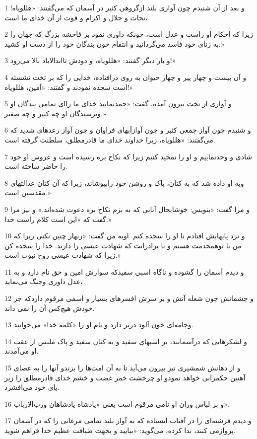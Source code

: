 \par 1 و بعد از آن شنیدم چون آوازی بلند ازگروهی کثیر در آسمان که می‌گفتند: «هللویاه! نجات و جلال و اکرام و قوت از آن خدای ما است،
\par 2 زیرا که احکام او راست و عدل است، چونکه داوری نمود بر فاحشه بزرگ که جهان را به زنای خود فاسد می‌گردانید و انتقام خون بندگان خود را از دست او کشید.»
\par 3 و بار دیگر گفتند: «هللویاه، و دودش تاابدالاباد بالا می‌رود!»
\par 4 و آن بیست و چهار پیر و چهار حیوان به روی درافتاده، خدایی را که بر تخت نشسته است سجده نمودند و گفتند: «آمین، هللویاه!»
\par 5 و آوازی از تخت بیرون آمده، گفت: «حمدنمایید خدای ما را‌ای تمامی بندگان او وترسندگان او چه کبیر و چه صغیر.»
\par 6 و شنیدم چون آواز جمعی کثیر و چون آوازآبهای فراوان و چون آواز رعدهای شدید که می‌گفتند: «هللویاه، زیرا خداوند خدای ما قادرمطلق، سلطنت گرفته است.
\par 7 شادی و وجدنماییم و او را تمجید کنیم زیرا که نکاح بره رسیده است و عروس او خود را حاضر ساخته است.
\par 8 وبه او داده شد که به کتان، پاک و روشن خود رابپوشاند، زیرا که آن کتان عدالتهای مقدسین است.»
\par 9 و مرا گفت: «بنویس: خوشابحال آنانی که به بزم نکاح بره دعوت شده‌اند.» و نیز مرا گفت که «این است کلام راست خدا.»
\par 10 و نزد پایهایش افتادم تا او را سجده کنم. اوبه من گفت: «زنهار چنین نکنی زیرا که من با توهمخدمت هستم و با برادرانت که شهادت عیسی را دارند. خدا را سجده کن زیرا که شهادت عیسی روح نبوت است.»
\par 11 و دیدم آسمان را گشوده و ناگاه اسبی سفیدکه سوارش امین و حق نام دارد و به عدل داوری وجنگ می‌نماید،
\par 12 و چشمانش چون شعله آتش و بر سرش افسرهای بسیار و اسمی مرقوم داردکه جز خودش هیچ‌کس آن را نمی داند.
\par 13 وجامه‌ای خون آلود دربر دارد و نام او را «کلمه خدا» می‌خوانند.
\par 14 و لشکرهایی که درآسمانند، بر اسبهای سفید و به کتان سفید و پاک ملبس از عقب او می‌آمدند.
\par 15 و از دهانش شمشیری تیز بیرون می‌آید تا به آن امت‌ها را بزندو آنها را به عصای آهنین حکمرانی خواهد نمودو او چرخشت خمر غضب و خشم خدای قادرمطلق را زیر پای خود می‌افشرد.
\par 16 و بر لباس وران او نامی مرقوم است یعنی «پادشاه پادشاهان ورب‌الارباب».
\par 17 و دیدم فرشته‌ای را در آفتاب ایستاده که به آواز بلند تمامی مرغانی را که در آسمان پروازمی کنند، ندا کرده، می‌گوید: «بیایید و بجهت ضیافت عظیم خدا فراهم شوید.
